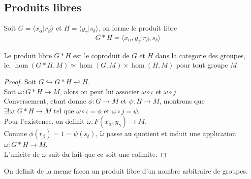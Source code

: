 \documentclass[../main.tex]{subfiles}
\begin{document}
\subsection{Produits libres}
Soit $G= \langle x_\alpha| r_\beta\rangle$ et $H = \langle y_\gamma | s_\delta\rangle$, on forme le produit libre
\[ 
G\ast H = \langle x_\alpha,y_\gamma | r_\beta, s_\delta\rangle
\]
\begin{propo}
Le produit libre $G\ast H$ est le coproduit de $G$ et $H$ dans la categorie des groupes, ie. $\hom( G\ast H, M) \simeq \hom( G,M) \times \hom( H,M) $ pour tout groupe $M$.
\end{propo}
\begin{proof}
	Soit $G\hookrightarrow G\ast H \hookleftarrow H$.\\
	Soit $\omega: G\ast H \to M$, alors on peut lui associer $\omega\circ\iota$ et $\omega\circ j$.\\
	Conversement, etant donne $\phi: G\to M$ et $\psi: H\to M$, montrons que $\exists! \omega: G\ast H \to M$ tel que $\omega\circ\iota= \phi$ et $\omega\circ j = \psi$.\\
	Pour l'existence, on definit $\tilde\omega: F( x_\alpha, y_\gamma) \to M$.\\
	Comme $\phi( r_\beta) = 1 =\psi( s_\delta) $, $\tilde\omega$ passe au quotient et induit une application  $\omega: G\ast H\to M$.\\
	L'unicite de $\omega$ suit du fait que ce soit une colimite.
\end{proof}
\begin{rmq}
On definit de la meme facon un produit libre d'un nombre arbitraire de groupes.
\end{rmq}
\end{document}
